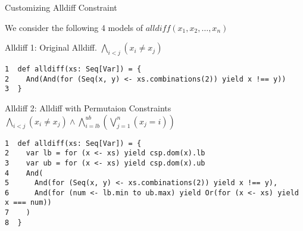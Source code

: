 \documentclass[compress,dvipdfmx]{beamer}
\begin{document}
\begin{frame}[fragile,label=sec-2]{Customizing Alldiff Constraint}
 \begin{block}{We consider the following 4 models of $alldiff(x_{1}, x_{2}, \ldots, x_{n})$}
\end{block}

\begin{block}{\alert{Alldiff 1}: Original Alldiff.}
$\bigwedge_{i<j} (x_{i} \ne x_{j})$
\begin{verbatim}
1  def alldiff(xs: Seq[Var]) = {
2    And(And(for (Seq(x, y) <- xs.combinations(2)) yield x !== y))
3  }
\end{verbatim}
\end{block}
\begin{block}{\alert{Alldiff 2}: Alldiff with Permutaion Constraints}
\(\bigwedge_{i<j} (x_{i} \ne x_{j}) \wedge \bigwedge_{i=lb}^{ub}\left(\bigvee_{j=1}^{n} (x_{j}=i)\right)\)
\begin{verbatim}
1  def alldiff(xs: Seq[Var]) = {
2    var lb = for (x <- xs) yield csp.dom(x).lb 
3    var ub = for (x <- xs) yield csp.dom(x).ub 
4    And(
5      And(for (Seq(x, y) <- xs.combinations(2)) yield x !== y),
6      And(for (num <- lb.min to ub.max) yield Or(for (x <- xs) yield x === num))
7    )
8  }
\end{verbatim}
\end{block}


\end{frame}
\end{document}
